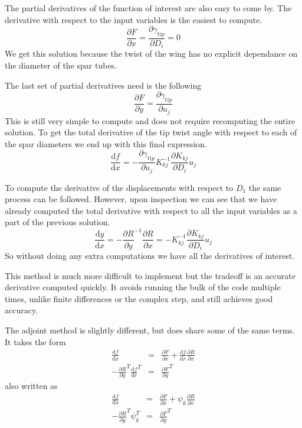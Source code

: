 \documentclass[12pt,parskip=full]{article}
\numberwithin{subsection}{section}
\begin{document}
		The partial derivatives of the function of interest are also easy to come by. The derivative with respect to the input variables
		is the easiest to compute.
		\begin{equation}
			\frac{\partial F}{\partial x} = \frac{\partial \gamma_{tip}}{\partial D_i} = 0
		\end{equation}
		We get this solution because the twist of the wing has no explicit dependance on the diameter of the spar tubes.
		
		The last set of partial derivatives need is the following
		\begin{equation}
			\frac{\partial F}{\partial y} = \frac{\partial \gamma_{tip}}{\partial u_j}
		\end{equation}
		This is still very simple to compute and does not require recomputing the entire solution. To get the total derivative of the
		tip twist angle with respect to each of the spar diameters we end up with this final expression.
		\begin{equation}
			\frac{\mathrm{d}f}{\mathrm{d}x} = -\frac{\partial \gamma_{tip}}{\partial u_j}K_{kj}^{-1}\frac{\partial K_{kj}}{\partial D_i}u_j
		\end{equation}

		To compute the derivative of the displacements with respect to $D_1$ the same process can be followed. However, upon inspection
		we can see that we have already computed the total derivative with respect to all the input variables as a part of the previous
		solution.
		\begin{equation}
			\frac{\mathrm{d}y}{\mathrm{d}x} = -\frac{\partial R}{\partial y}^{-1}\frac{\partial R}{\partial x} = -K_{kj}^{-1}\frac{\partial K_{kj}}{\partial D_i}u_j
		\end{equation}
		So without doing any extra computations we have all the derivatives of interest.
		
		This method is much more difficult to implement but the tradeoff is an accurate derivative computed quickly. It avoids running
		the bulk of the code multiple times, unlike finite differences or the complex step, and still achieves good accuracy.
		
		The adjoint method is slightly different, but does share some of the same terms. It takes the form
		\begin{eqnarray}
			\frac{\mathrm{d}f}{\mathrm{d}x} &=& \frac{\partial F}{\partial x} + \frac{\mathrm{d}f}{\mathrm{d}r}\frac{\partial R}{\partial x} \\
			-\frac{\partial R}{\partial y}^T\frac{\mathrm{d}f}{\mathrm{d}r}^T &=& \frac{\partial F}{\partial y}^T
		\end{eqnarray}
		also written as
		\begin{eqnarray}
			\frac{\mathrm{d}f}{\mathrm{d}x} &=& \frac{\partial F}{\partial x} + \psi_{k}\frac{\partial R}{\partial x} \\
			-\frac{\partial R}{\partial y}^T\psi_{k}^T &=& \frac{\partial F}{\partial y}^T
		\end{eqnarray}
		
\end{document}
